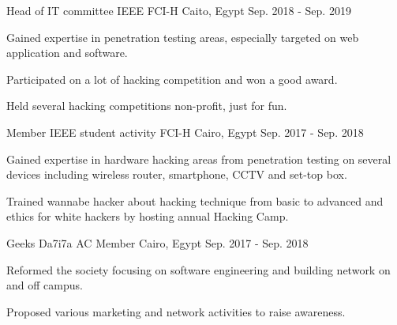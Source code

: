 

\begin{cventries}

  \cventry
    {Head of IT committee} %
    {IEEE FCI-H} %
    {Caito, Egypt} %
    {Sep. 2018 - Sep. 2019} %
    {
      \begin{cvitems} %
        \item {Gained expertise in penetration testing areas, especially targeted on web application and software.}
        \item {Participated on a lot of hacking competition and won a good award.}
        \item {Held several hacking competitions non-profit, just for fun.}
      \end{cvitems}
    }

  \cventry
    {Member} %
    {IEEE student activity FCI-H} %
    {Cairo, Egypt} %
    {Sep. 2017 - Sep. 2018} %
    {
      \begin{cvitems} %
        \item {Gained expertise in hardware hacking areas from penetration testing on several devices including wireless router, smartphone, CCTV and set-top box.}
        \item {Trained wannabe hacker about hacking technique from basic to advanced and ethics for white hackers by hosting annual Hacking Camp.}
      \end{cvitems}
    }

  \cventry
    {Geeks Da7i7a} %
    {AC Member} %
    {Cairo, Egypt} %
    {Sep. 2017 - Sep. 2018} %
    {
      \begin{cvitems} %
        \item {Reformed the society focusing on software engineering and building network on and off campus.}
        \item {Proposed various marketing and network activities to raise awareness.}
      \end{cvitems}
    }


\end{cventries}
